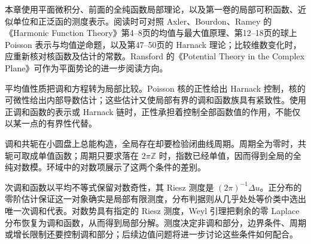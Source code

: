 \ProseParagraphBreak
本章使用平面微积分、前面的全纯函数局部理论，以及第一卷的局部可积函数、近似单位和正泛函的测度表示。阅读时可对照 Axler、Bourdon、Ramey 的《Harmonic Function Theory》\cite{Axler2001Harmonic}第4--8页的均值与最大值原理、第12--18页的球上 Poisson 表示与均值逆命题，以及第47--50页的 Harnack 理论；比较维数变化时，应重新核对核函数及估计的常数。Ransford 的《Potential Theory in the Complex Plane》\cite{Ransford1995Potential}可作为平面势论的进一步阅读方向。






\begin{chaptersummary}
平均值性质把调和方程转为局部比较。Poisson 核的正性给出 Harnack 控制，核的可微性给出内部导数估计；这些估计又使局部有界的调和函数族具有紧致性。使用正调和函数的表示或 Harnack 链时，正性承担着控制全部函数值的作用，不能仅以某一点的有界性代替。

\ProseParagraphBreak
调和共轭在小圆盘上总能构造，全局存在却要检验闭曲线周期。周期全为零时，共轭可取成单值函数；周期只要求落在 \(2\pi\mathbb Z\) 时，指数已经单值，因而得到全局的全纯对数模。环域中的对数项展示了这两个条件的差别。

\ProseParagraphBreak
次调和函数以平均不等式保留对数奇性，其 Riesz 测度是 \((2\pi)^{-1}\Delta u\)。正分布的零阶估计保证这一对象确实是局部有限测度，分布判据则从几乎处处等价类中选出唯一次调和代表。对数势具有指定的 Riesz 测度，Weyl 引理把剩余的零 Laplace 分布恢复为调和函数，从而得到局部分解。测度决定非调和部分，边界条件、周期或增长限制还要控制调和部分；后续边值问题将进一步讨论这些条件如何配合。
\end{chaptersummary}

\BookExercises

